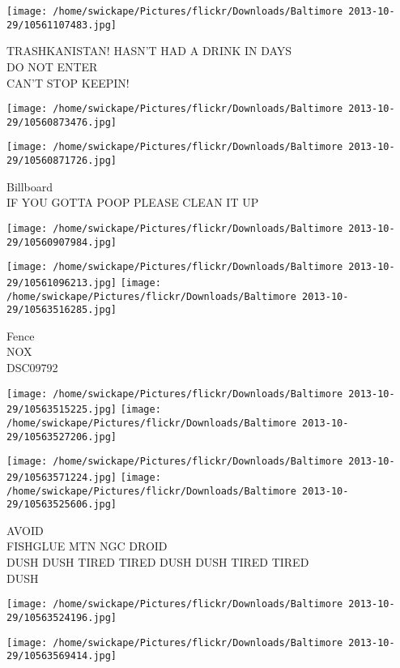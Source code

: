 \documentclass[10pt,letterpaper]{article}
\begin{document}
\vspace{0.25in}
\texttt{[image: /home/swickape/Pictures/flickr/Downloads/Baltimore 2013-10-29/10561107483.jpg]}

TRASHKANISTAN! HASN'T HAD A DRINK IN DAYS\\
DO NOT ENTER\\
CAN'T STOP KEEPIN!
\pagebreak

\texttt{[image: /home/swickape/Pictures/flickr/Downloads/Baltimore 2013-10-29/10560873476.jpg]}

\vspace{0.25in}
\texttt{[image: /home/swickape/Pictures/flickr/Downloads/Baltimore 2013-10-29/10560871726.jpg]}

Billboard\\
IF YOU GOTTA POOP PLEASE CLEAN IT UP
\pagebreak

\texttt{[image: /home/swickape/Pictures/flickr/Downloads/Baltimore 2013-10-29/10560907984.jpg]}

\vspace{0.25in}
\texttt{[image: /home/swickape/Pictures/flickr/Downloads/Baltimore 2013-10-29/10561096213.jpg]}
\texttt{[image: /home/swickape/Pictures/flickr/Downloads/Baltimore 2013-10-29/10563516285.jpg]}

Fence\\
NOX\\
DSC09792
\pagebreak

\texttt{[image: /home/swickape/Pictures/flickr/Downloads/Baltimore 2013-10-29/10563515225.jpg]}
\texttt{[image: /home/swickape/Pictures/flickr/Downloads/Baltimore 2013-10-29/10563527206.jpg]}

\texttt{[image: /home/swickape/Pictures/flickr/Downloads/Baltimore 2013-10-29/10563571224.jpg]}
\texttt{[image: /home/swickape/Pictures/flickr/Downloads/Baltimore 2013-10-29/10563525606.jpg]}

AVOID\\
FISHGLUE MTN NGC DROID\\
DUSH DUSH TIRED TIRED DUSH DUSH TIRED TIRED\\
DUSH
\pagebreak

\texttt{[image: /home/swickape/Pictures/flickr/Downloads/Baltimore 2013-10-29/10563524196.jpg]}

\vspace{0.25in}
\texttt{[image: /home/swickape/Pictures/flickr/Downloads/Baltimore 2013-10-29/10563569414.jpg]}
\end{document}
